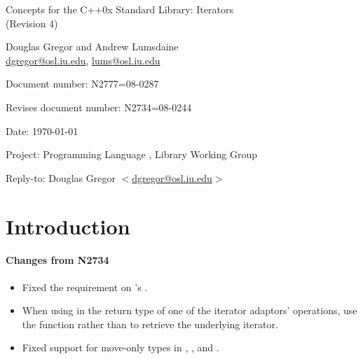 \documentclass[american,twoside]{book}
\begin{document}
\raggedbottom

\begin{titlepage}
\begin{center}
\huge
Concepts for the C++0x Standard Library: Iterators \\
(Revision 4)
\vspace{0.5in}

\normalsize
Douglas Gregor and Andrew Lumsdaine \\
\href{mailto:dgregor@osl.iu.edu}{dgregor@osl.iu.edu}, \href{mailto:lums@osl.iu.edu}{lums@osl.iu.edu}
\end{center}

\vspace{1in}
\par\noindent Document number: N2777=08-0287 \vspace{-6pt}
\par\noindent Revises document number: N2734=08-0244 \vspace{-6pt}
\par\noindent Date: \today\vspace{-6pt}
\par\noindent Project: Programming Language \Cpp{}, Library Working Group\vspace{-6pt}
\par\noindent Reply-to: Douglas Gregor $<$\href{mailto:dgregor@osl.iu.edu}{dgregor@osl.iu.edu}$>$\vspace{-6pt}

\section*{Introduction}

\paragraph*{Changes from N2734}
\begin{itemize}
\item Fixed the  requirement on
  's .
\item When using  in the return type of one of the
  iterator adaptors'  operations, use the
   function rather than  to retrieve the
  underlying iterator.
\item Fixed support for move-only types in , , and .
\end{itemize}
\end{titlepage}
\end{document}
